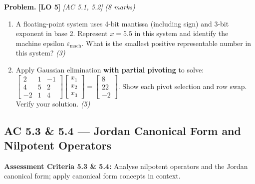 \documentclass[12pt,a4paper]{article}
\newcommand{\lo}[1]{\textcolor{locolor}{\textbf{[LO #1]}}}
\newcommand{\ac}[1]{\textcolor{locolor}{\textit{[AC #1]}}}
\newcommand{\mat}[1]{\begin{bmatrix}#1\end{bmatrix}}
\begin{document}
	\begin{tcolorbox}[practice]
		\textbf{Problem.} \lo{5} \ac{5.1, 5.2} \hfill \textit{(8 marks)}
		
		\begin{enumerate}[label=(\alph*)]
			\item A floating-point system uses 4-bit mantissa (including sign) and 3-bit exponent in base 2.
			Represent $x = 5.5$ in this system and identify the machine epsilon $\varepsilon_{\text{mach}}$.
			What is the smallest positive representable number in this system? \hfill\textit{(3)}
			\item Apply Gaussian elimination \textbf{with partial pivoting} to solve:
			$\mat{2&1&-1\\4&5&2\\-2&1&4}\mat{x_1\\x_2\\x_3}=\mat{8\\22\\-2}$.
			Show each pivot selection and row swap. Verify your solution. \hfill\textit{(5)}
		\end{enumerate}
	\end{tcolorbox}
	
	\begin{tcolorbox}[answer]
	\end{tcolorbox}
	
	\newpage
	
	\subsection{AC 5.3 \& 5.4 — Jordan Canonical Form and Nilpotent Operators}
	
	\begin{tcolorbox}[subtopic]
		\textbf{Assessment Criteria 5.3 \& 5.4:} Analyse nilpotent operators and the Jordan canonical
		form; apply canonical form concepts in context.
	\end{tcolorbox}
	
\end{document}
